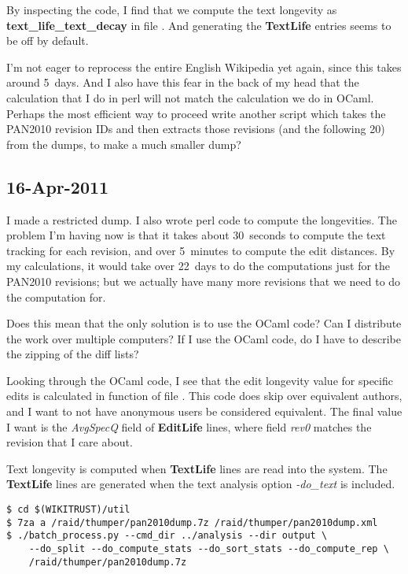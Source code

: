 By inspecting the code, I find that we compute the text longevity
as \textbf{text\_life\_text\_decay} in file .
And generating the \textbf{TextLife} entries seems to be off by default.

I'm not eager to reprocess the entire English Wikipedia yet again,
since this takes around 5~days.
And I also have this fear in the back of my head that the calculation
that I do in perl will not match the calculation we do in OCaml.
Perhaps the most efficient way to proceed write another script
which takes the PAN2010 revision IDs and then extracts those revisions
(and the following 20) from the dumps, to make a much smaller dump?

\subsection{16-Apr-2011}

I made a restricted dump.
I also wrote perl code to compute the longevities.
The problem I'm having now is that it takes about 30~seconds
to compute the text tracking for each revision, and over
5~minutes to compute the edit distances.
By my calculations, it would take over 22~days to do the
computations just for the PAN2010 revisions; but we actually
have many more revisions that we need to do the computation for.

Does this mean that the only solution is to use the OCaml code?
Can I distribute the work over multiple computers?
If I use the OCaml code, do I have to describe the zipping of
the diff lists?

Looking through the OCaml code, I see that the edit longevity
value for specific edits is calculated in
function  of
file .
This code does skip over equivalent authors,
and I want to not have anonymous users be considered equivalent.
The final value I want is the \textit{AvgSpecQ} field of
\textbf{EditLife} lines, where field \textit{rev0} matches
the revision that I care about.

Text longevity is computed when \textbf{TextLife} lines are read
into the system.
The \textbf{TextLife} lines are generated when the text analysis
option \textit{-do\_text} is included.

\begin{verbatim}
$ cd $(WIKITRUST)/util
$ 7za a /raid/thumper/pan2010dump.7z /raid/thumper/pan2010dump.xml
$ ./batch_process.py --cmd_dir ../analysis --dir output \
    --do_split --do_compute_stats --do_sort_stats --do_compute_rep \
    /raid/thumper/pan2010dump.7z
\end{verbatim}

